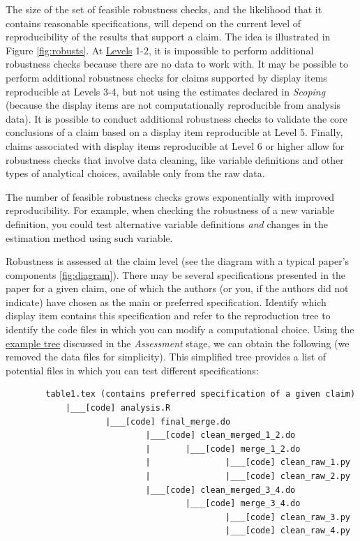 \documentclass[
  openany]{book}
\begin{document}
The size of the set of feasible robustness checks, and the likelihood that it contains reasonable specifications, will depend on the current level of reproducibility of the results that support a claim. The idea is illustrated in Figure \ref{fig:robusts}. At \protect\hyperlink{levels-of-computational-reproducibility-for-a-specific-output}{Levels} 1-2, it is impossible to perform additional robustness checks because there are no data to work with. It may be possible to perform additional robustness checks for claims supported by display items reproducible at Levels 3-4, but not using the estimates declared in \emph{Scoping} (because the display items are not computationally reproducible from analysis data). It is possible to conduct additional robustness checks to validate the core conclusions of a claim based on a display item reproducible at Level 5. Finally, claims associated with display items reproducible at Level 6 or higher allow for robustness checks that involve data cleaning, like variable definitions and other types of analytical choices, available only from the raw data.

The number of feasible robustness checks grows exponentially with improved reproducibility. For example, when checking the robustness of a new variable definition, you could test alternative variable definitions \emph{and} changes in the estimation method using such variable.

Robustness is assessed at the claim level (see the diagram with a typical paper's components \ref{fig:diagram}). There may be several specifications presented in the paper for a given claim, one of which the authors (or you, if the authors did not indicate) have chosen as the main or preferred specification. Identify which display item contains this specification and refer to the reproduction tree to identify the code files in which you can modify a computational choice. Using the \protect\hyperlink{complete-tree}{example tree} discussed in the \emph{Assessment} stage, we can obtain the following (we removed the data files for simplicity). This simplified tree provides a list of potential files in which you can test different specifications:

\begin{verbatim}
        table1.tex (contains preferred specification of a given claim)
            |___[code] analysis.R
                    |___[code] final_merge.do
                            |___[code] clean_merged_1_2.do
                            |       |___[code] merge_1_2.do
                            |               |___[code] clean_raw_1.py
                            |               |___[code] clean_raw_2.py
                            |___[code] clean_merged_3_4.do
                                    |___[code] merge_3_4.do
                                            |___[code] clean_raw_3.py
                                            |___[code] clean_raw_4.py
\end{verbatim}
\end{document}

